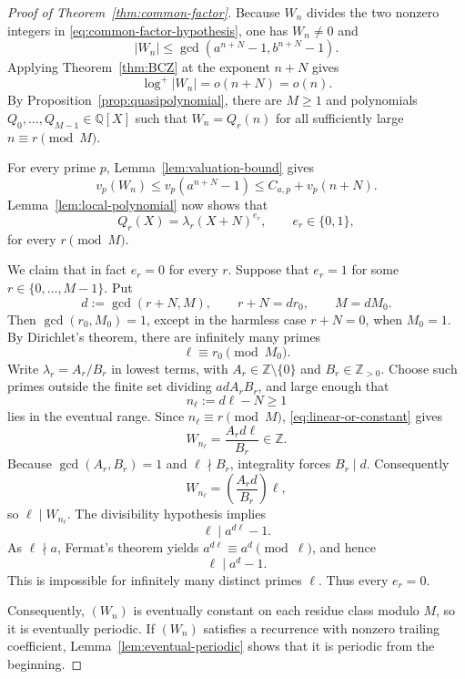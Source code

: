 \documentclass[10pt,a4paper]{amsart}
\newcommand{\Q}{\mathbb Q}
\newcommand{\Z}{\mathbb Z}
\begin{document}
\begin{proof}[Proof of Theorem~\ref{thm:common-factor}]
Because $W_n$ divides the two nonzero integers in
\eqref{eq:common-factor-hypothesis}, one has $W_n\ne 0$ and
\[
  |W_n|\le \gcd(a^{n+N}-1,b^{n+N}-1).
\]
Applying Theorem~\ref{thm:BCZ} at the exponent $n+N$ gives
\[
  \log^+|W_n|=o(n+N)=o(n).
\]
By Proposition~\ref{prop:quasipolynomial}, there are $M\ge 1$ and polynomials
$Q_0,\dots,Q_{M-1}\in\Q[X]$ such that $W_n=Q_r(n)$ for all sufficiently large
$n\equiv r\pmod M$.

For every prime $p$, Lemma~\ref{lem:valuation-bound} gives
\[
  v_p(W_n)\le v_p(a^{n+N}-1)
  \le C_{a,p}+v_p(n+N).
\]
Lemma~\ref{lem:local-polynomial} now shows that
\begin{equation}\label{eq:linear-or-constant}
  Q_r(X)=\lambda_r(X+N)^{e_r},
  \qquad e_r\in\{0,1\},
\end{equation}
for every $r\pmod M$.

We claim that in fact $e_r=0$ for every $r$.  Suppose that $e_r=1$ for some
$r\in\{0,\dots,M-1\}$.  Put
\[
  d:=\gcd(r+N,M),\qquad r+N=d r_0,\qquad M=dM_0.
\]
Then $\gcd(r_0,M_0)=1$, except in the harmless case $r+N=0$, when $M_0=1$.
By Dirichlet's theorem, there are infinitely many primes
\[
  \ell\equiv r_0\pmod{M_0}.
\]
Write $\lambda_r=A_r/B_r$ in lowest terms, with
$A_r\in\Z\setminus\{0\}$ and $B_r\in\Z_{>0}$.  Choose such primes outside the
finite set dividing $a d A_rB_r$, and large enough that
\[
  n_\ell:=d\ell-N\ge 1
\]
lies in the eventual range.  Since $n_\ell\equiv r\pmod M$,
\eqref{eq:linear-or-constant} gives
\[
  W_{n_\ell}=\frac{A_r d\ell}{B_r}\in\Z.
\]
Because $\gcd(A_r,B_r)=1$ and $\ell\nmid B_r$, integrality forces
$B_r\mid d$.  Consequently
\[
  W_{n_\ell}=\left(\frac{A_r d}{B_r}\right)\ell,
\]
so $\ell\mid W_{n_\ell}$.  The divisibility hypothesis implies
\[
  \ell\mid a^{d\ell}-1.
\]
As $\ell\nmid a$, Fermat's theorem yields
$a^{d\ell}\equiv a^d\pmod\ell$, and hence
\[
  \ell\mid a^d-1.
\]
This is impossible for infinitely many distinct primes $\ell$.  Thus every
$e_r=0$.

Consequently, $(W_n)$ is eventually constant on each residue class modulo $M$,
so it is eventually periodic.  If $(W_n)$ satisfies a recurrence with nonzero
trailing coefficient, Lemma~\ref{lem:eventual-periodic} shows that it is periodic
from the beginning.
\end{proof}
\end{document}
